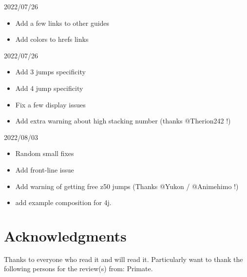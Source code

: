\documentclass{article}
\begin{document}
2022/07/26
\begin{itemize}
    \item Add a few links to other guides
    \item Add colors to hrefs links
\end{itemize}

2022/07/26
\begin{itemize}
    \item Add 3 jumps specificity
    \item Add 4 jump specificity
    \item Fix a few display issues 
    \item Add extra warning about high stacking number (thanks @Therion242 !)
\end{itemize}

2022/08/03
\begin{itemize}
    \item Random small fixes
    \item Add \hewmaan front-line issue
    \item Add warning of getting free z50 jumps (Thanks @Yukon / @Animehimo !)
    \item add example composition for 4j.
\end{itemize}

    
\section{Acknowledgments}

Thanks to everyone who read it and will read it.
Particularly want to thank the following persons for the review(s) from: Primate.
\end{document}
